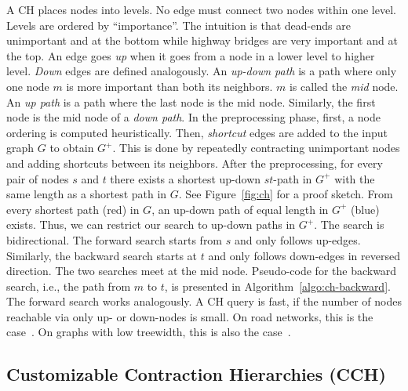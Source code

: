 \documentclass[manuscript,review]{acmart}
\begin{document}
A CH places nodes into levels.
No edge must connect two nodes within one level.
Levels are ordered by ``importance''.
The intuition is that dead-ends are unimportant and at the bottom while highway bridges are very important and at the top.
An edge goes \emph{up} when it goes from a node in a lower level to higher level.
\emph{Down} edges are defined analogously.
An \emph{up-down path} is a path where only one node $m$ is more important than both its neighbors.
$m$ is called the \emph{mid} node.
An \emph{up path} is a path where the last node is the mid node.
Similarly, the first node is the mid node of a \emph{down path}.
%
In the preprocessing phase, first, a node ordering is computed heuristically.
Then, \emph{shortcut} edges are added to the input graph $G$ to obtain $G^+$.
This is done by repeatedly contracting unimportant nodes and adding shortcuts between its neighbors.
After the preprocessing, for every pair of nodes $s$ and $t$ there exists a shortest up-down $st$-path in $G^+$ with the same length as a shortest path in $G$.
See Figure~\ref{fig:ch} for a proof sketch.
From every shortest path (red) in $G$, an up-down path of equal length in $G^+$ (blue) exists.
Thus, we can restrict our search to up-down paths in $G^+$.
The search is bidirectional.
The forward search starts from $s$ and only follows up-edges.
Similarly, the backward search starts at $t$ and only follows down-edges in reversed direction.
The two searches meet at the mid node.
Pseudo-code for the backward search, i.e., the path from $m$ to $t$, is presented in Algorithm~\ref{algo:ch-backward}.
The forward search works analogously.
%
A CH query is fast, if the number of nodes reachable via only up- or down-nodes is small.
On road networks, this is the case~\cite{gssv-erlrn-12,dgpw-crprn-13}.
On graphs with low treewidth, this is also the case~\cite{dsw-cch-15,hs-gbpo-18}.


\subsection{Customizable Contraction Hierarchies (CCH)}
\end{document}
